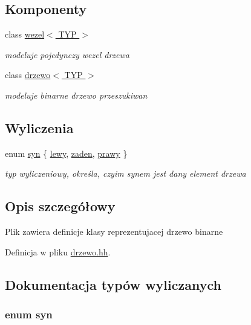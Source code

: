 \subsection*{Komponenty}
\begin{DoxyCompactItemize}
\item 
class \hyperlink{classwezel}{wezel$<$ T\-Y\-P $>$}
\begin{DoxyCompactList}\small\item\em modeluje pojedynczy wezel drzewa \end{DoxyCompactList}\item 
class \hyperlink{classdrzewo}{drzewo$<$ T\-Y\-P $>$}
\begin{DoxyCompactList}\small\item\em modeluje binarne drzewo przeszukiwan \end{DoxyCompactList}\end{DoxyCompactItemize}
\subsection*{Wyliczenia}
\begin{DoxyCompactItemize}
\item 
enum \hyperlink{drzewo_8hh_a9bf0b5cfb3ec8e645ac2e89e92db4361}{syn} \{ \hyperlink{drzewo_8hh_a9bf0b5cfb3ec8e645ac2e89e92db4361abbc80c0ed35ca719378ba12902e0e707}{lewy}, 
\hyperlink{drzewo_8hh_a9bf0b5cfb3ec8e645ac2e89e92db4361aa54bc1808862835bcdbbbb54651e3895}{zaden}, 
\hyperlink{drzewo_8hh_a9bf0b5cfb3ec8e645ac2e89e92db4361af44652ccf1abf2a5d5670ba455a1b38e}{prawy}
 \}
\begin{DoxyCompactList}\small\item\em typ wyliczeniowy, określa, czyim synem jest dany element drzewa \end{DoxyCompactList}\end{DoxyCompactItemize}


\subsection{Opis szczegółowy}
Plik zawiera definicje klasy reprezentujacej drzewo binarne 

Definicja w pliku \hyperlink{drzewo_8hh_source}{drzewo.\-hh}.



\subsection{Dokumentacja typów wyliczanych}
\hypertarget{drzewo_8hh_a9bf0b5cfb3ec8e645ac2e89e92db4361}{
\subsubsection[{syn}]{\setlength{\rightskip}{0pt plus 5cm}enum {\bf syn}}}\label{drzewo_8hh_a9bf0b5cfb3ec8e645ac2e89e92db4361}



